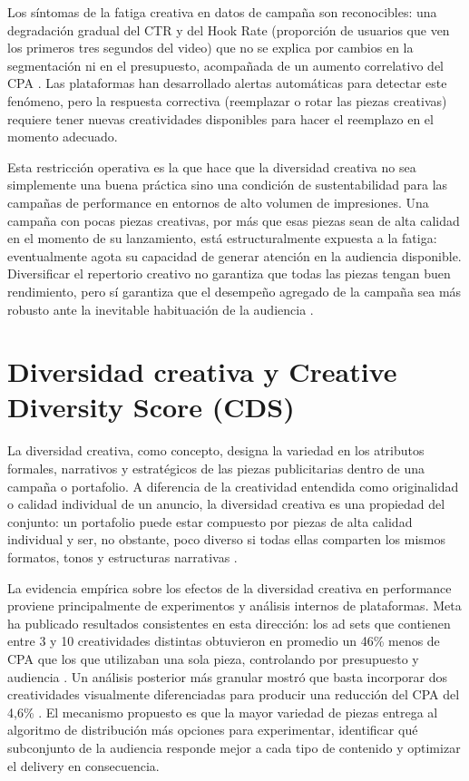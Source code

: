 \documentclass[12pt, a4paper]{report}
\begin{document}
Los síntomas de la fatiga creativa en datos de campaña son reconocibles: una degradación gradual del
CTR y del Hook Rate (proporción de usuarios que ven los primeros tres segundos del video) que no se
explica por cambios en la segmentación ni en el presupuesto, acompañada de un aumento correlativo del
CPA \citep{adlib2022}. Las plataformas han desarrollado alertas automáticas para detectar este
fenómeno, pero la respuesta correctiva (reemplazar o rotar las piezas creativas) requiere tener
nuevas creatividades disponibles para hacer el reemplazo en el momento adecuado.

Esta restricción operativa es la que hace que la diversidad creativa no sea simplemente una buena
práctica sino una condición de sustentabilidad para las campañas de performance en entornos de alto
volumen de impresiones. Una campaña con pocas piezas creativas, por más que esas piezas sean de alta
calidad en el momento de su lanzamiento, está estructuralmente expuesta a la fatiga: eventualmente
agota su capacidad de generar atención en la audiencia disponible. Diversificar el repertorio creativo
no garantiza que todas las piezas tengan buen rendimiento, pero sí garantiza que el desempeño agregado
de la campaña sea más robusto ante la inevitable habituación de la audiencia \citep{singular2025}.

\section{Diversidad creativa y Creative Diversity Score (CDS)}

La diversidad creativa, como concepto, designa la variedad en los atributos formales, narrativos y
estratégicos de las piezas publicitarias dentro de una campaña o portafolio. A diferencia de la
creatividad entendida como originalidad o calidad individual de un anuncio, la diversidad creativa
es una propiedad del conjunto: un portafolio puede estar compuesto por piezas de alta calidad
individual y ser, no obstante, poco diverso si todas ellas comparten los mismos formatos, tonos y
estructuras narrativas \citep{jcr_diversity2024}.

La evidencia empírica sobre los efectos de la diversidad creativa en performance proviene principalmente
de experimentos y análisis internos de plataformas. Meta ha publicado resultados consistentes en esta
dirección: los ad sets que contienen entre 3 y 10 creatividades distintas obtuvieron en promedio un
46\% menos de CPA que los que utilizaban una sola pieza, controlando por presupuesto y audiencia
\citep{meta2024a}. Un análisis posterior más granular mostró que basta incorporar dos creatividades
visualmente diferenciadas para producir una reducción del CPA del 4,6\% \citep{meta2024b}. El
mecanismo propuesto es que la mayor variedad de piezas entrega al algoritmo de distribución más
opciones para experimentar, identificar qué subconjunto de la audiencia responde mejor a cada tipo
de contenido y optimizar el delivery en consecuencia.
\end{document}
